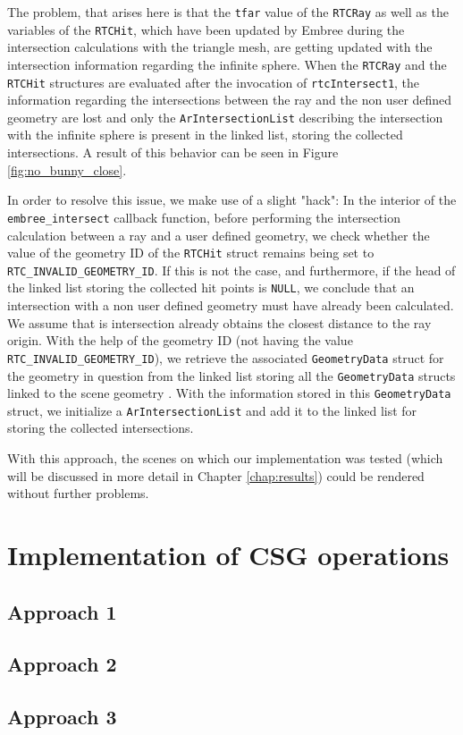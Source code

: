 The problem, that arises here is that the \texttt{tfar} value of the \texttt{RTCRay} as well as the variables of the \texttt{RTCHit}, which have been updated by Embree during the intersection calculations with the triangle mesh, are getting updated with the intersection information regarding the infinite sphere. When the \texttt{RTCRay} and the \texttt{RTCHit} structures are evaluated after the invocation of \texttt{rtcIntersect1}, the information regarding the intersections between the ray and the non user defined geometry are lost and only the \texttt{ArIntersectionList} describing the intersection with the infinite sphere is present in the linked list, storing the collected intersections. A result of this behavior can be seen in Figure \ref{fig:no_bunny_close}. 

In order to resolve this issue, we make use of a slight "hack": In the interior of the \texttt{embree\_intersect} callback function, before performing the intersection calculation between a ray and a user defined geometry, we check whether the value of the geometry ID of the \texttt{RTCHit} struct remains being set to \texttt{RTC\_INVALID\_GEOMETRY\_ID}. If this is not the case, and furthermore, if the head of the linked list storing the collected hit points is \texttt{NULL}, we conclude that an intersection with a non user defined geometry must have already been calculated. We assume that is intersection already obtains the closest distance to the ray origin. With the help of the geometry ID (not having the value \texttt{RTC\_INVALID\_GEOMETRY\_ID}), we retrieve the associated \texttt{GeometryData} struct  for the geometry in question from the linked list storing all the \texttt{GeometryData} structs linked to the scene geometry . With the information stored in this \texttt{GeometryData} struct, we initialize a \texttt{ArIntersectionList} and add it to the linked list for storing the collected intersections.

With this approach, the scenes on which our implementation was tested (which will be discussed in more detail in Chapter \ref{chap:results}) could be rendered without further problems.


\section{Implementation of CSG operations}
\label{sec:embree_csg}
\subsection{Approach 1}
\subsection{Approach 2}
\subsection{Approach 3}
